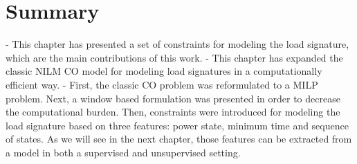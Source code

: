\vfill


\section{Summary}
- This chapter has presented a set of constraints for modeling the load signature, which are the main contributions of this work. 
- This chapter has expanded the classic NILM CO model for modeling load signatures in a computationally efficient way. 
- First, the classic CO problem was reformulated to a MILP problem. Next, a window based formulation was presented in order to decrease the computational burden. Then, constraints were introduced for modeling the load signature based on three features: power state, minimum time and sequence of states. As we will see in the next chapter, those features can be extracted from a model in both a supervised and unsupervised setting. 